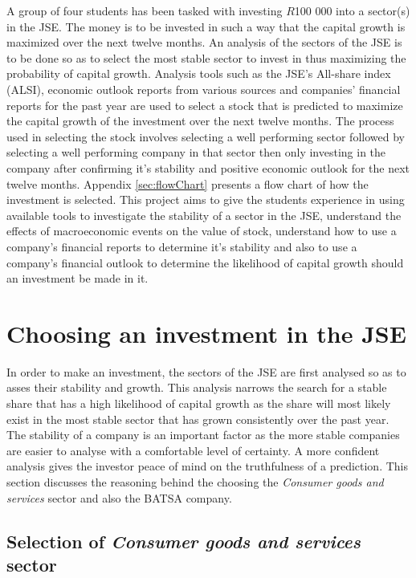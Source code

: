 \documentclass[letterpaper, 10 pt, conference]{ieeeconf}  %
\begin{document}
A group of four students has been tasked with investing $R$100 000 into a sector(s) in the JSE. The money is to be invested in such a way that the capital growth is maximized over the next twelve months. An analysis of the sectors of the JSE is to be done so as to select the most stable sector to invest in thus maximizing the probability of capital growth. Analysis tools such as the JSE's All-share index (ALSI), economic outlook reports from various sources and companies' financial reports for the past year are used to select a stock that is predicted to maximize the capital growth of the investment over the next twelve months. The process used in selecting the stock involves selecting a well performing sector followed by selecting a well performing company in that sector then only investing in the company after confirming it's stability and positive economic outlook for the next twelve months. Appendix \ref{sec:flowChart} presents a flow chart of how the investment is selected. This project aims to give the students experience in using available tools to investigate the stability of a sector in the JSE, understand the effects of macroeconomic events on the value of stock, understand how to use a company's financial reports to determine it's stability and also to use a company's financial outlook to determine the likelihood of capital growth should an investment be made in it. 

\section{Choosing an investment in the JSE}

In order to make an investment, the sectors of the JSE are first analysed so as to asses their stability and growth. This analysis narrows the search for a stable share that has a high likelihood of capital growth as the share will most likely exist in the most stable sector that has grown consistently over the past year. The stability of a company is an important factor as the more stable companies are easier to analyse with a comfortable level of certainty. A more confident analysis gives the investor peace of mind on the truthfulness of a prediction. This section discusses the reasoning behind the choosing the \textit{Consumer goods and services} sector and also the BATSA company.

\subsection{Selection of \textit{Consumer goods and services} sector}
\end{document}
